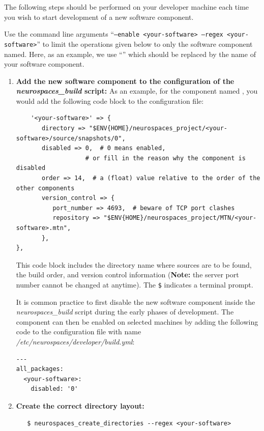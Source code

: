 \documentclass[12pt]{article}
\begin{document}
The following steps should be performed on your developer machine each time you wish to start development of a new software component.

Use the command line arguments ``{\tt --enable <your-software> --regex <your-software>}'' to limit the operations given below to only the software component named. Here, as an example, we use ``{\tt <your-software>}'' which should be replaced by the name of your software component. 

\begin{enumerate}
\item {\bf Add the new software component to the configuration of the {\it neurospaces\_build} script:} As an example, for the component named {\tt <your-software>}, you would add the following code block to the configuration file:
\begin{verbatim}
	'<your-software>' => {
	   directory => "$ENV{HOME}/neurospaces_project/<your-software>/source/snapshots/0",
	   disabled => 0,  # 0 means enabled,
                   # or fill in the reason why the component is disabled
	   order => 14,  # a (float) value relative to the order of the other components
	   version_control => {
	      port_number => 4693,  # beware of TCP port clashes
	      repository => "$ENV{HOME}/neurospaces_project/MTN/<your-software>.mtn",
	   },
},
\end{verbatim}
  This code block includes the directory name where sources are to be
  found, the build order, and version control information ({\bf Note:}
  the server port number cannot be changed at anytime). The {\tt \$} indicates a terminal prompt.

  It is common practice to first disable the new software component
  inside the {\it neurospaces\_build} script during the early phases
  of development.  The component can then be enabled on selected
  machines by adding the following code to the configuration file with
  name {\it /etc/neurospaces/developer/build.yml}:

\begin{verbatim}
---
all_packages:
  <your-software>:
    disabled: '0'
\end{verbatim}



\item {\bf Create the correct directory layout:}
\begin{verbatim}
   $ neurospaces_create_directories --regex <your-software>
\end{verbatim}
  

\end{enumerate}
\end{document}
